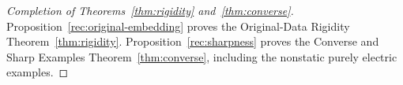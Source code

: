 \begin{proof}[Completion of Theorems~\ref{thm:rigidity} and~\ref{thm:converse}]
Proposition~\ref{rec:original-embedding} proves the Original-Data
Rigidity Theorem~\ref{thm:rigidity}. Proposition~\ref{rec:sharpness}
proves the Converse and Sharp Examples Theorem~\ref{thm:converse},
including the nonstatic purely electric examples.
\end{proof}
